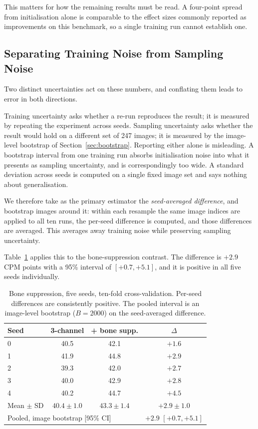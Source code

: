 \documentclass[11pt,a4paper]{article}
\begin{document}
This matters for how the remaining results must be read. A four-point spread
from initialisation alone is comparable to the effect sizes commonly reported
as improvements on this benchmark, so a single training run cannot establish
one.

\subsection{Separating Training Noise from Sampling Noise}
\label{sec:twonoise}

Two distinct uncertainties act on these numbers, and conflating them leads to
error in both directions.

Training uncertainty asks whether a re-run reproduces the result; it is
measured by repeating the experiment across seeds. Sampling uncertainty asks
whether the result would hold on a different set of 247 images; it is measured
by the image-level bootstrap of Section~\ref{sec:bootstrap}. Reporting either
alone is misleading. A bootstrap interval from one training run absorbs
initialisation noise into what it presents as sampling uncertainty, and is
correspondingly too wide. A standard deviation across seeds is computed on a
single fixed image set and says nothing about generalisation.

We therefore take as the primary estimator the \emph{seed-averaged difference},
and bootstrap images around it: within each resample the same image indices are
applied to all ten runs, the per-seed difference is computed, and those
differences are averaged. This averages away training noise while preserving
sampling uncertainty.

Table~\ref{tab:bone} applies this to the bone-suppression contrast. The
difference is $+2.9$ CPM points with a 95\% interval of $[+0.7, +5.1]$, and it
is positive in all five seeds individually.

\begin{table}[t]
\centering
\caption{Bone suppression, five seeds, ten-fold cross-validation. Per-seed
differences are consistently positive. The pooled interval is an image-level
bootstrap ($B = 2000$) on the seed-averaged difference.}
\label{tab:bone}
\begin{tabular}{lccc}
\toprule
Seed & 3-channel & + bone supp. & $\Delta$ \\
\midrule
0 & 40.5 & 42.1 & $+1.6$ \\
1 & 41.9 & 44.8 & $+2.9$ \\
2 & 39.3 & 42.0 & $+2.7$ \\
3 & 40.0 & 42.9 & $+2.8$ \\
4 & 40.2 & 44.7 & $+4.5$ \\
\midrule
Mean $\pm$ SD & $40.4 \pm 1.0$ & $43.3 \pm 1.4$ & $+2.9 \pm 1.0$ \\
\midrule
\multicolumn{3}{l}{Pooled, image bootstrap [95\% CI]} & $+2.9$ $[+0.7, +5.1]$ \\
\bottomrule
\end{tabular}
\end{table}
\end{document}
